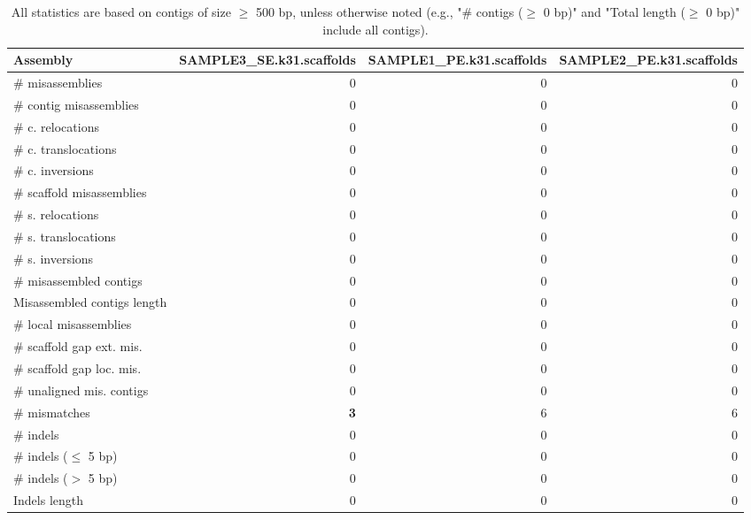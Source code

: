 \documentclass[12pt,a4paper]{article}
\begin{document}
\begin{table}[ht]
\begin{center}
\caption{All statistics are based on contigs of size $\geq$ 500 bp, unless otherwise noted (e.g., "\# contigs ($\geq$ 0 bp)" and "Total length ($\geq$ 0 bp)" include all contigs).}
\begin{tabular}{|l*{3}{|r}|}
\hline
Assembly & SAMPLE3\_SE.k31.scaffolds & SAMPLE1\_PE.k31.scaffolds & SAMPLE2\_PE.k31.scaffolds \\ \hline
\# misassemblies & 0 & 0 & 0 \\ \hline
\hspace{2mm}\# contig misassemblies & 0 & 0 & 0 \\ \hline
\hspace{5mm}\# c. relocations & 0 & 0 & 0 \\ \hline
\hspace{5mm}\# c. translocations & 0 & 0 & 0 \\ \hline
\hspace{5mm}\# c. inversions & 0 & 0 & 0 \\ \hline
\hspace{2mm}\# scaffold misassemblies & 0 & 0 & 0 \\ \hline
\hspace{5mm}\# s. relocations & 0 & 0 & 0 \\ \hline
\hspace{5mm}\# s. translocations & 0 & 0 & 0 \\ \hline
\hspace{5mm}\# s. inversions & 0 & 0 & 0 \\ \hline
\# misassembled contigs & 0 & 0 & 0 \\ \hline
Misassembled contigs length & 0 & 0 & 0 \\ \hline
\# local misassemblies & 0 & 0 & 0 \\ \hline
\# scaffold gap ext. mis. & 0 & 0 & 0 \\ \hline
\# scaffold gap loc. mis. & 0 & 0 & 0 \\ \hline
\# unaligned mis. contigs & 0 & 0 & 0 \\ \hline
\# mismatches & {\bf 3} & 6 & 6 \\ \hline
\# indels & 0 & 0 & 0 \\ \hline
\hspace{5mm}\# indels ($\leq$ 5 bp) & 0 & 0 & 0 \\ \hline
\hspace{5mm}\# indels ($>$ 5 bp) & 0 & 0 & 0 \\ \hline
Indels length & 0 & 0 & 0 \\ \hline
\end{tabular}
\end{center}
\end{table}
\end{document}
